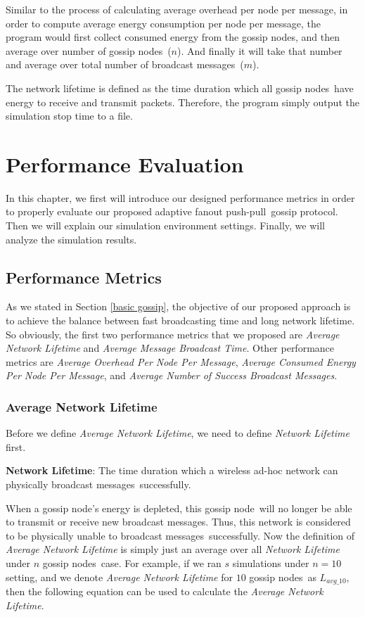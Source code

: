 \documentclass[onehalf,11pt]{beavtex}
\newcommand{\gp}{gossip protocol}
\newcommand{\msgs}{messages}
\newcommand{\msg}{message}
\newcommand{\pp}{push-pull}
\newcommand{\gn}{gossip node}
\newcommand{\gns}{gossip nodes}
\newcommand{\nl}{Network Lifetime}
\begin{document}
Similar to the process of calculating average overhead per node per \msg, in order to compute average energy consumption per node per \msg, the program would first collect consumed energy from the \gns, and then average over number of \gns ~($n$). And finally it will take that number and average over total number of broadcast \msgs ~($m$). 

The network lifetime is defined as the time duration which all \gns ~have energy to receive and transmit packets. Therefore, the program simply output the simulation stop time to a file.

\chapter{Performance Evaluation}
\label{Chapter5}

In this chapter, we first will introduce our designed performance metrics in order to properly evaluate our proposed adaptive fanout \pp ~\gp. Then we will explain our simulation environment settings. Finally, we will analyze the simulation results.

\section{Performance Metrics} \label{pm}
As we stated in Section \ref{basic gossip}, the objective of our proposed approach is to achieve the balance between fast broadcasting time and long network lifetime. So obviously, the first two performance metrics that we proposed are \emph{Average \nl} and \emph{Average Message Broadcast Time}. Other performance metrics are \emph{Average Overhead Per Node Per Message}, \emph{Average Consumed Energy Per Node Per Message}, and \emph{Average Number of Success Broadcast Messages}.

\subsection{Average Network Lifetime}

Before we define \emph{Average Network Lifetime}, we need to define \emph{Network Lifetime} first. 

\textbf{Network Lifetime}: The time duration which a wireless ad-hoc network can physically broadcast \msgs ~successfully.

When a \gn's energy is depleted, this \gn ~will no longer be able to transmit or receive new broadcast \msgs. Thus, this network is considered to be physically unable to broadcast \msgs ~successfully. Now the definition of \emph{Average Network Lifetime} is simply just an average over all \emph{Network Lifetime} under $n$ \gns ~case. For example, if we ran $s$ simulations under $n=10$ setting, and we denote \emph{Average Network Lifetime} for $10$ \gns ~as $L_{avg\_10}$, then the following equation can be used to calculate the \emph{Average Network Lifetime}.
\end{document}

